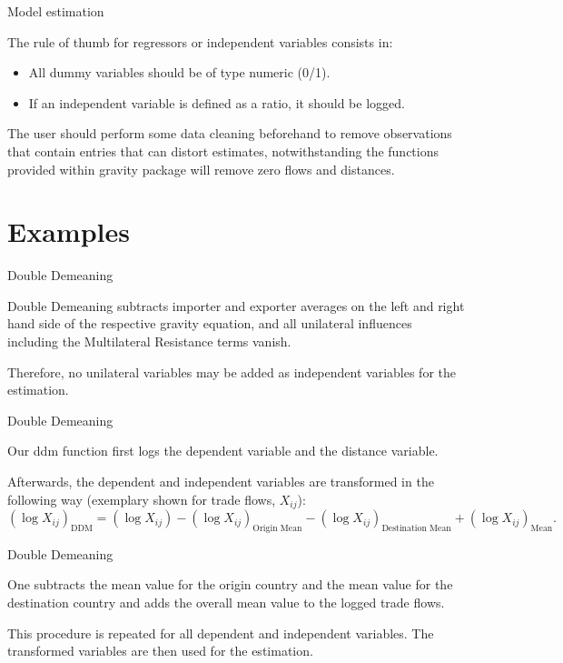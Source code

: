 \documentclass[ignorenonframetext,compress,aspectratio=169]{beamer}
\providecommand{\tightlist}{%
  \setlength{\itemsep}{0pt}\setlength{\parskip}{0pt}}
\begin{document}
\begin{frame}{Model estimation}

The rule of thumb for regressors or independent variables consists in:

\begin{itemize}
\tightlist
\item
  All dummy variables should be of type numeric (0/1).
\item
  If an independent variable is defined as a ratio, it should be logged.
\end{itemize}

The user should perform some data cleaning beforehand to remove
observations that contain entries that can distort estimates,
notwithstanding the functions provided within gravity package will
remove zero flows and distances.

\end{frame}

\section{Examples}\label{examples}

\begin{frame}{Double Demeaning}

Double Demeaning subtracts importer and exporter averages on the left
and right hand side of the respective gravity equation, and all
unilateral influences including the Multilateral Resistance terms
vanish.

Therefore, no unilateral variables may be added as independent variables
for the estimation.

\end{frame}

\begin{frame}{Double Demeaning}

Our ddm function first logs the dependent variable and the distance
variable.

Afterwards, the dependent and independent variables are transformed in
the following way (exemplary shown for trade flows, \(X_{ij}\)): \[
(\log X_{ij})_{\text{DDM}} = (\log X_{ij}) - (\log X_{ij})_{\text{Origin Mean}} - (\log X_{ij})_{\text{Destination Mean}} + (\log X_{ij})_{\text{Mean}}.
\]

\end{frame}

\begin{frame}{Double Demeaning}

One subtracts the mean value for the origin country and the mean value
for the destination country and adds the overall mean value to the
logged trade flows.

This procedure is repeated for all dependent and independent variables.
The transformed variables are then used for the estimation.

\end{frame}
\end{document}

